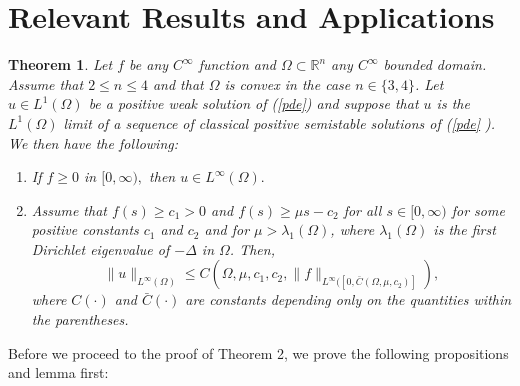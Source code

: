 \documentclass[paper=a4, fontsize=11pt]{scrartcl} %
\numberwithin{equation}{section} %
\numberwithin{figure}{section} %
\numberwithin{table}{section} %
\newtheorem{theorem}{Theorem}
\numberwithin{exercise}{section}
\begin{document}
\section{Relevant  Results and Applications}
\begin{theorem}
Let $f$ be any $C^{\infty}$ function and $\Omega\subset \mathbb{R}^n$ any $C^{\infty}$ bounded domain. Assume that $2\leq n\leq 4$ and that $\Omega$ is convex in the case $n\in \{3,4\}$.
Let $u\in L^1(\Omega)$ be a positive weak solution of (\ref{pde}) and suppose that $u$ is the $L^1(\Omega)$ limit of a sequence of classical positive semistable solutions of (\ref{pde} ). We then have the following:
\begin{enumerate}
\item If $f\geq 0$ in $[0,\infty),$ then $u\in L^{\infty}(\Omega).$
\item Assume that $f(s)\geq c_1>0$ and $f(s)\geq \mu s-c_2$ for all $s\in[0,\infty)$ for some positive constants $c_1$ and $c_2$ and for $\mu >\lambda_1(\Omega)$, where $\lambda_1(\Omega)$ is the first Dirichlet eigenvalue of $-\Delta$ in $\Omega$. Then,
$$\|u\|_{L^{\infty}(\Omega)} \leq C(\Omega,\mu, c_1,c_2,\| f\|_{L^{\infty} ([0,\bar{C}(\Omega,\mu,c_2)]}),$$
where $C(\cdot)$ and $\bar{C}(\cdot)$ are constants depending only on the quantities within the parentheses.
\end{enumerate}
\end{theorem}
Before we proceed to the proof of Theorem 2, we prove the following propositions and lemma first:
\end{document}

